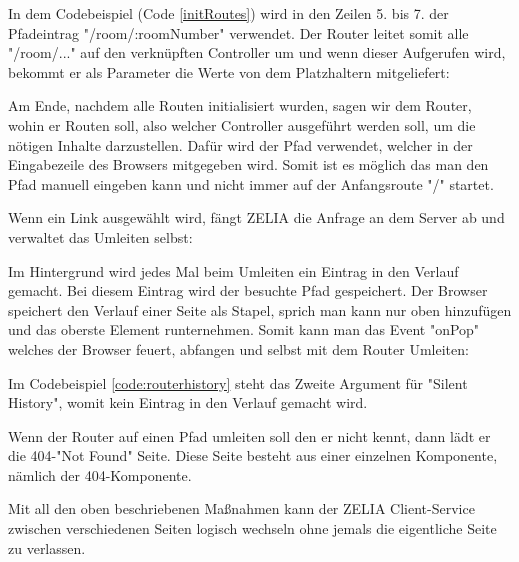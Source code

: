 
In dem Codebeispiel (Code \ref{initRoutes}) wird in den Zeilen 5. bis 7. der Pfadeintrag "/room/:roomNumber" verwendet. Der Router leitet somit alle "/room/..." auf den verknüpften Controller um und wenn dieser Aufgerufen wird, bekommt er als Parameter die Werte von dem Platzhaltern mitgeliefert:


Am Ende, nachdem alle Routen initialisiert wurden, sagen wir dem Router, wohin er Routen soll, also welcher Controller ausgeführt werden soll, um die nötigen Inhalte darzustellen. Dafür wird der Pfad verwendet, welcher in der Eingabezeile des Browsers mitgegeben wird. Somit ist es möglich das man den Pfad manuell eingeben kann und nicht immer auf der Anfangsroute "/" startet.

Wenn ein Link ausgewählt wird, fängt ZELIA die Anfrage an dem Server ab und verwaltet das Umleiten selbst:


Im  Hintergrund wird jedes Mal beim Umleiten ein Eintrag in den Verlauf gemacht. Bei diesem Eintrag wird der besuchte Pfad gespeichert. Der Browser speichert den Verlauf einer Seite als Stapel, sprich man kann nur oben hinzufügen und das oberste Element runternehmen. Somit kann man das Event "onPop" welches der Browser feuert, abfangen und selbst mit dem Router Umleiten:


Im Codebeispiel \ref{code:routerhistory} steht das Zweite Argument für "Silent History", womit kein Eintrag in den Verlauf gemacht wird.

Wenn der Router auf einen Pfad umleiten soll den er nicht kennt, dann lädt er die 404-"Not Found" Seite. Diese Seite besteht aus einer einzelnen Komponente, nämlich der 404-Komponente.


Mit all den oben beschriebenen Maßnahmen kann der ZELIA Client-Service zwischen verschiedenen Seiten logisch wechseln ohne jemals die eigentliche Seite zu verlassen.
